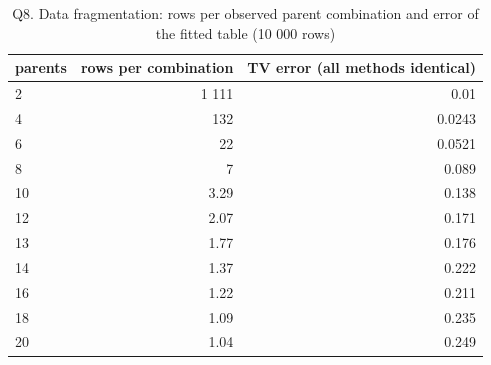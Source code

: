 \begin{table}[H]\centering\small
\caption{Q8. Data fragmentation: rows per observed parent combination and error of the fitted table (10 000 rows)}\label{tab:q8}

\begin{tabular}{lrr}\toprule
parents & rows per combination & TV error (all methods identical) \\ \midrule
2 & 1 111 & 0.01 \\
4 & 132 & 0.0243 \\
6 & 22 & 0.0521 \\
8 & 7 & 0.089 \\
10 & 3.29 & 0.138 \\
12 & 2.07 & 0.171 \\
13 & 1.77 & 0.176 \\
14 & 1.37 & 0.222 \\
16 & 1.22 & 0.211 \\
18 & 1.09 & 0.235 \\
20 & 1.04 & 0.249 \\
\bottomrule\end{tabular}
\end{table}
